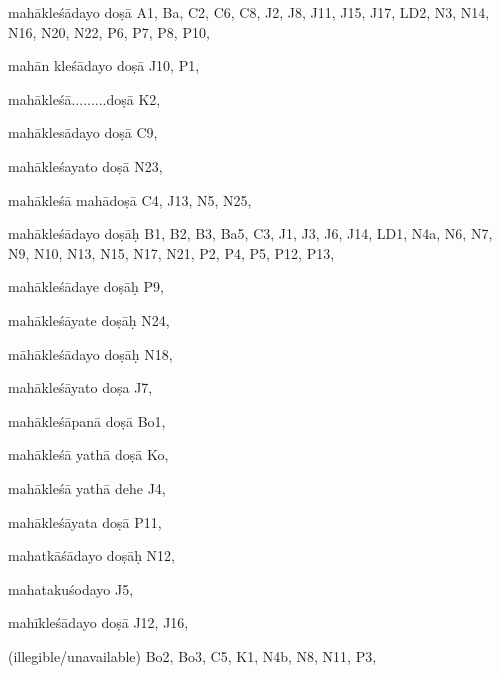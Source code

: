 \begin{marma}[hp02_014]


\item[mahākleśādayo doṣā] A1, Ba, C2, C6, C8, J2, J8, J11, J15, J17, LD2, N3, N14, N16, N20, N22, P6, P7, P8, P10,
\item[mahān kleśādayo doṣā] J10, P1, 
\item[mahākleśā.........doṣā] K2,
\item[mahāklesādayo doṣā] C9,
\item[mahākleśayato doṣā] N23,
\item[mahākleśā mahādoṣā] C4, J13, N5, N25, 
\item[mahākleśādayo doṣāḥ] B1, B2, B3, Ba5, C3, J1, J3, J6, J14, LD1, N4a, N6, N7, N9, N10, N13, N15, N17, N21, P2, P4, P5, P12, P13, 
\item[mahākleśādaye doṣāḥ] P9,
\item[mahākleśāyate doṣāḥ] N24,
\item[māhākleśādayo doṣāḥ] N18,
\item[mahākleśāyato doṣa] J7, 
\item[mahākleśāpanā doṣā] Bo1,
\item[mahākleśā yathā doṣā] Ko,
\item[mahākleśā yathā dehe] J4, 
\item[mahākleśāyata doṣā] P11,
\item[mahatkāśādayo doṣāḥ] N12,
\item[mahatakuśodayo] J5,
\item[mahīkleśādayo doṣā] J12, J16, 
  \item[(illegible/unavailable)] Bo2, Bo3, C5, K1, N4b, N8, N11, P3,

  \begin{description}
    \end{description}

  \end{marma}

